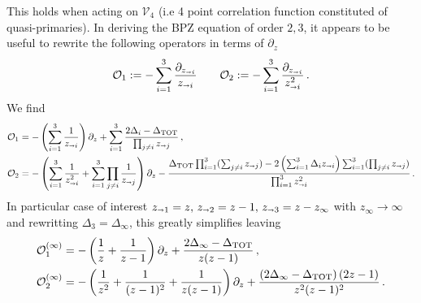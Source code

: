 \documentclass[11pt]{article}
\begin{document}
This holds when acting on $\mathcal{V}_{4}$ (i.e 4 point correlation function constituted of quasi-primaries). In deriving the BPZ equation of order $2,3$, it appears to be useful to rewrite the following operators in terms of $\partial_z$
\begin{equation}
  \mathcal{O}_1 :=-\sum_{i=1}^{3}\frac{\partial_{z_{\shortrightarrow i}}}{z_{\shortrightarrow i}}  \qquad \mathcal{O}_2  :=-\sum_{i=1}^{3}\frac{\partial_{z_{\shortrightarrow i}}}{z^2_{\shortrightarrow i}} \,.
\end{equation}
We find
\begin{equation}
  \begin{aligned}
    \mathcal{O}_1  &= -\left(\sum_{i=1}^{3}\frac{1}{z_{\shortrightarrow i}}\right)\partial_z + \sum_{i=1}^{3}\frac{2\Delta_i -\Delta_{\rm TOT}}{\prod_{j\neq i}z_{\shortrightarrow j}}\,,\\
    \mathcal{O}_2  &= -\left(\sum_{i=1}^3 \frac{1}{z_{\shortrightarrow i}^2} +\sum_{i=1}^3 \prod_{j \neq i}\frac{1}{z_{\shortrightarrow j}}\right)\partial_z-\frac{\Delta_{\rm TOT}\prod_{i=1}^{3}(\sum_{j \neq i} z_{\shortrightarrow j})- 2\left(\sum_{i=1}^{3}\Delta_i z_{\shortrightarrow i}\right)\sum_{i=1}^{3}(\prod_{j \neq i} z_{\shortrightarrow j})}{\prod_{i=1}^{3}z_{\shortrightarrow i}^2}\,.
  \end{aligned}
\end{equation}
In particular case of interest $z_{\shortrightarrow 1}=z,\,z_{\shortrightarrow 2}=z-1,\,z_{\shortrightarrow 3} = z-z_{\infty}$ with $z_{\infty}\to \infty$ and rewritting $\Delta_3 = \Delta_{\infty}$, this greatly simplifies leaving
\begin{equation}\label{eq:veryuseful}
  \begin{aligned}
    \mathcal{O}^{(\infty)}_1  &= -\left(\frac{1}{z}+\frac{1}{z-1}\right)\partial_z +\frac{2\Delta_{\infty} -\Delta_{\rm TOT}}{z(z-1)}\,,\\
    \mathcal{O}^{(\infty)}_2  &= -\left(\frac{1}{z^2}+\frac{1}{(z-1)^2}+\frac{1}{z(z-1)}\right)\partial_z+\frac{\left(2\Delta_{\infty}-\Delta_{\rm TOT}\right)(2z-1)}{z^2(z-1)^2}\,.
  \end{aligned}
\end{equation}
\end{document}
